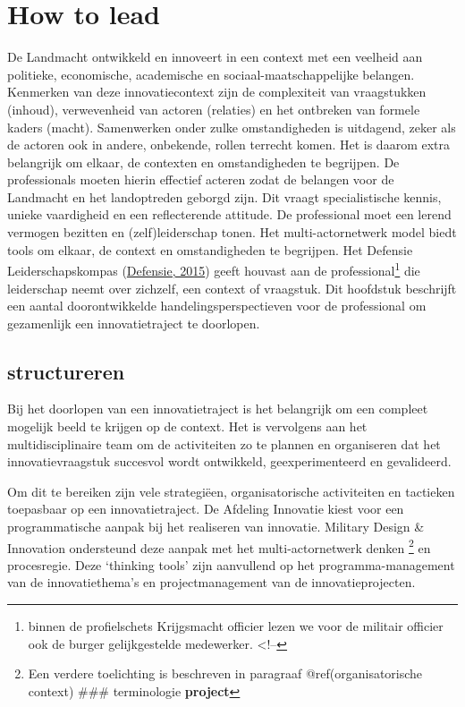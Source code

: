 \documentclass[
]{book}
\begin{document}
\hypertarget{how-to-lead}{%
\chapter{\texorpdfstring{How to lead }{How to lead }}\label{how-to-lead}}

De Landmacht ontwikkeld en innoveert in een context met een veelheid aan politieke, economische, academische en sociaal-maatschappelijke belangen. Kenmerken van deze innovatiecontext zijn de complexiteit van vraagstukken (inhoud), verwevenheid van actoren (relaties) en het ontbreken van formele kaders (macht).
Samenwerken onder zulke omstandigheden is uitdagend, zeker als de actoren ook in andere, onbekende, rollen terrecht komen. Het is daarom extra belangrijk om elkaar, de contexten en omstandigheden te begrijpen. De professionals moeten hierin effectief acteren zodat de belangen voor de Landmacht en het landoptreden geborgd zijn.
Dit vraagt specialistische kennis, unieke vaardigheid en een reflecterende attitude. De professional moet een lerend vermogen bezitten en (zelf)leiderschap tonen.
Het multi-actornetwerk model biedt tools om elkaar, de context en omstandigheden te begrijpen.
Het Defensie Leiderschapskompas (\protect\hyperlink{ref-ministerie_van_defensie_visie_2015}{Defensie, 2015}) geeft houvast aan de professional\footnote{binnen de profielschets Krijgsmacht officier lezen we voor de militair officier ook de burger gelijkgestelde medewerker.
  \textless!--} die leiderschap neemt over zichzelf, een context of vraagstuk.
Dit hoofdstuk beschrijft een aantal doorontwikkelde handelingsperspectieven voor de professional om gezamenlijk een innovatietraject te doorlopen.

\hypertarget{structureren}{%
\section{structureren}\label{structureren}}

Bij het doorlopen van een innovatietraject is het belangrijk om een compleet mogelijk beeld te krijgen op de context. Het is vervolgens aan het multidisciplinaire team om de activiteiten zo te plannen en organiseren dat het innovatievraagstuk succesvol wordt ontwikkeld, geexperimenteerd en gevalideerd.

Om dit te bereiken zijn vele strategiëen, organisatorische activiteiten en tactieken toepasbaar op een innovatietraject. De Afdeling Innovatie kiest voor een programmatische aanpak bij het realiseren van innovatie. Military Design \& Innovation ondersteund deze aanpak met het multi-actornetwerk denken \footnote{Een verdere toelichting is beschreven in paragraaf @ref(organisatorische context)
  \#\#\# terminologie
  \textbf{project}} en procesregie. Deze `thinking tools' zijn aanvullend op het programma-management van de innovatiethema's en projectmanagement van de innovatieprojecten.
\end{document}
